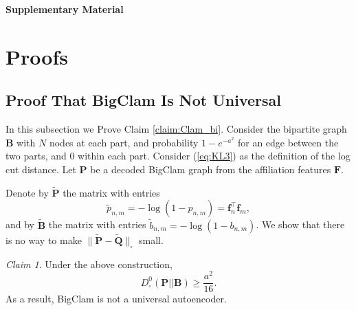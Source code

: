 \documentclass{article}
\theoremstyle{plain}
\theoremstyle{definition}
\theoremstyle{remark}
\newtheorem{claim}[theorem]{Claim}
\begin{document}






\newpage
\appendix
\onecolumn

\appendix

\begin{center}
{\huge \textbf{Supplementary Material}}


\end{center}

\section{Proofs}

\subsection{Proof That BigClam Is Not Universal}
\label{Proof That BigClam Is Not Universal}
In this subsection we Prove Claim \ref{claim:Clam_bi}. 
Consider the bipartite graph $\mathbf{B}$ with $N$ nodes at each part, and probability $1-e^{-a^2}$ for an edge between the two parts, and $0$ within each part. Consider (\ref{eq:KL3}) as the definition of the log cut distance. Let $\mathbf{P}$ be a decoded BigClam graph from the affiliation features $\mathbf{F}$.

Denote by $\tilde{\mathbf{P}}$ the matrix with entries 
\[\tilde{p}_{n,m}=-\log(1-p_{n,m})=\mathbf{f}_n^\top\mathbf{f}_m,\] 
and by $\tilde{\mathbf{B}}$ the matrix  with entries $\tilde{b}_{n,m}=-\log(1-b_{n,m})$.
We show that there is no way to make $\| \tilde{\mathbf{P}}-\tilde{\mathbf{Q}}\|_{\square}$ small.

\begin{claim}
    Under the above construction, 
    \[D^0_{\square}(\mathbf{P} || \mathbf{B}) \geq \frac{a^2}{16}.\]
    As a result, BigClam is not a universal autoencoder.
\end{claim}
\end{document}
